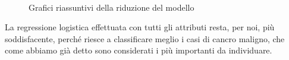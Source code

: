 \documentclass[11pt,a4paper,oneside]{article}
\begin{document}
\begin{figure}[h]
\centering
{}
 \\
\caption{Grafici riassuntivi della riduzione del modello}
\label{fig:riduzioni}
\end{figure}

La regressione logistica effettuata con tutti gli attributi resta, per noi, più soddisfacente, perché riesce a classificare meglio i casi di cancro maligno, che come abbiamo già detto sono considerati i più importanti da individuare.
\end{document}
